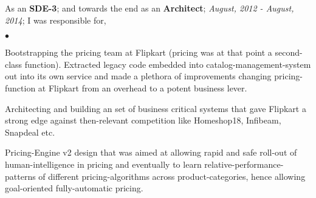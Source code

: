 \documentclass[margin,line]{res}
\newenvironment{list2}{
  \begin{list}{$\bullet$}{%
      \setlength{\itemsep}{0in}
      \setlength{\parsep}{0in} \setlength{\parskip}{0in}
      \setlength{\topsep}{0in} \setlength{\partopsep}{0in} 
      \setlength{\leftmargin}{0.2in}}}{\end{list}}
\begin{document}
\begin{resume}
As an {\bf SDE-3}; and towards the end as an {\bf Architect}; {\em August, 2012 - August, 2014}; I was responsible for,\\
\begin{list2}
\item Bootstrapping the pricing team at Flipkart (pricing was at that point a second-class function). Extracted legacy code embedded into catalog-management-system out into its own service and made a plethora of improvements changing pricing-function at Flipkart from an overhead to a potent business lever.
\item Architecting and building an set of business critical systems that gave Flipkart a strong edge against then-relevant competition like Homeshop18, Infibeam, Snapdeal etc.
\item Pricing-Engine v2 design that was aimed at allowing rapid and safe roll-out of human-intelligence in pricing and eventually to learn relative-performance-patterns of different pricing-algorithms across product-categories, hence allowing goal-oriented fully-automatic pricing.
\end{list2}


\end{resume}
\end{document}

